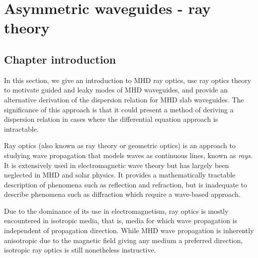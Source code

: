 \documentclass[12pt]{../style-files/ociamthesis}
\begin{document}
\baselineskip=18pt

\setcounter{secnumdepth}{3}
\setcounter{tocdepth}{3}

\setcounter{chapter}{2}

\newcommand{\figdir}{../main/figures/chpt-3/} %

\newcommand{\bv}{\mathbf{v}}
\newcommand{\bB}{\mathbf{B}}

\chapter{Asymmetric waveguides - ray theory}
\label{chap: ray}

\section{Chapter introduction}
\label{sec: ray intro}

	In this section, we give an introduction to MHD ray optics, use ray optics theory to motivate guided and leaky modes of MHD waveguides, and provide an alternative derivation of the dispersion relation for MHD slab waveguides. The significance of this approach is that it could present a method of deriving a dispersion relation in cases where the differential equation approach is intractable.
	
	Ray optics (also known as ray theory or geometric optics) is an approach to studying wave propagation that models waves as continuous lines, known as \textit{rays}. It is extensively used in electromagnetic wave theory but has largely been neglected in MHD and solar physics. It provides a mathematically tractable description of phenomena such as reflection and refraction, but is inadequate to describe phenomena such as diffraction which require a wave-based approach.
	
	Due to the dominance of its use in electromagnetism, ray optics is mostly encountered in isotropic media, that is, media for which wave propagation is independent of propagation direction. While MHD wave propagation is inherently anisotropic due to the magnetic field giving any medium a preferred direction, isotropic ray optics is still nonetheless instructive.
	
\end{document}

